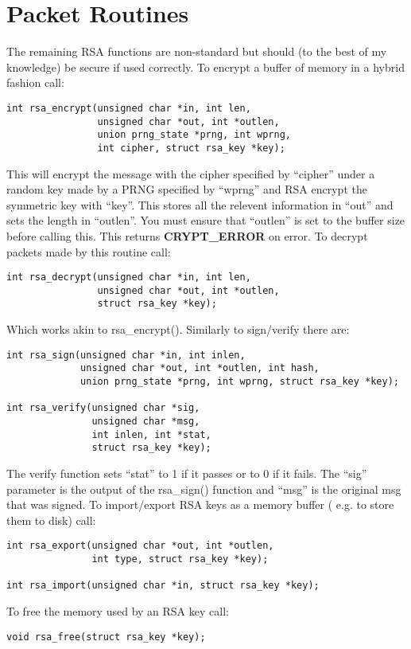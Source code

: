 \documentclass{book}
\begin{document}
\section{Packet Routines}
The remaining RSA functions are non-standard but should (to the best of my knowledge) be secure if used correctly.  To
encrypt a buffer of memory in a hybrid fashion call:
\begin{verbatim}
int rsa_encrypt(unsigned char *in, int len, 
                unsigned char *out, int *outlen,
                union prng_state *prng, int wprng, 
                int cipher, struct rsa_key *key);
\end{verbatim}
This will encrypt the message with the cipher specified by ``cipher'' under a random key made by a PRNG specified by
``wprng'' and RSA encrypt the symmetric key with ``key''.  This stores all the relevent information in ``out'' and sets
the length in ``outlen''.  You must ensure that ``outlen'' is set to the buffer size before calling this.  This returns
{\bf CRYPT\_ERROR} on error.  To decrypt packets made by this routine call:
\begin{verbatim}
int rsa_decrypt(unsigned char *in, int len, 
                unsigned char *out, int *outlen, 
                struct rsa_key *key);
\end{verbatim}
Which works akin to rsa\_encrypt().  Similarly to sign/verify there are:
\begin{verbatim}
int rsa_sign(unsigned char *in, int inlen, 
             unsigned char *out, int *outlen, int hash, 
             union prng_state *prng, int wprng, struct rsa_key *key);

int rsa_verify(unsigned char *sig, 
               unsigned char *msg, 
               int inlen, int *stat, 
               struct rsa_key *key);
\end{verbatim}

The verify function sets ``stat'' to 1 if it passes or to 0 if it fails.  The ``sig'' parameter is the output of the
rsa\_sign() function and ``msg'' is the original msg that was signed.  To import/export RSA keys as a memory buffer (
e.g. to store them to disk) call:
\begin{verbatim}
int rsa_export(unsigned char *out, int *outlen, 
               int type, struct rsa_key *key);

int rsa_import(unsigned char *in, struct rsa_key *key);
\end{verbatim}

To free the memory used by an RSA key call:
\begin{verbatim}
void rsa_free(struct rsa_key *key);
\end{verbatim}

\backmatter
\appendix

\end{document}
